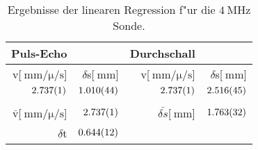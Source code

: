 \begin{table}[!h]
\begin{center}
\begin{tabular}{|r|r|r|r|}
\hline
Puls-Echo & & Durchschall & \\
\hline
\hline
v[$\SI{}{\milli\meter\per\micro\per\second}$] & $\delta$s[$\SI{}{\milli\meter}$] & v[$\SI{}{\milli\meter\per\micro\per\second}$]& $\delta$s[$\SI{}{\milli\meter}$]\\
\hline
$\SI{2.737 (1)}{}$ & $\SI{1.010 (44)}{}$ & $\SI{2.737 (1)}{}$ & $\SI{2.516 (45)}{}$\\
\hline
\hline
&&&\\
$\bar{\mathrm{v}}$[$\SI{}{\milli\meter\per\micro\per\second}$] & $\SI{2.737 (1)}{}$ & $\bar{\delta s}$[$\SI{}{\milli\meter}$] & $\SI{1.763 (32)}{}$\\
\hline
$\delta$t & $\SI{0.644 (12)}{}$ &&\\
\hline
\end{tabular}
\caption[]{Ergebnisse der linearen Regression f"ur die $\SI{4}{\mega\hertz}$ Sonde.}
\label{r4}
\end{center}
\end{table}